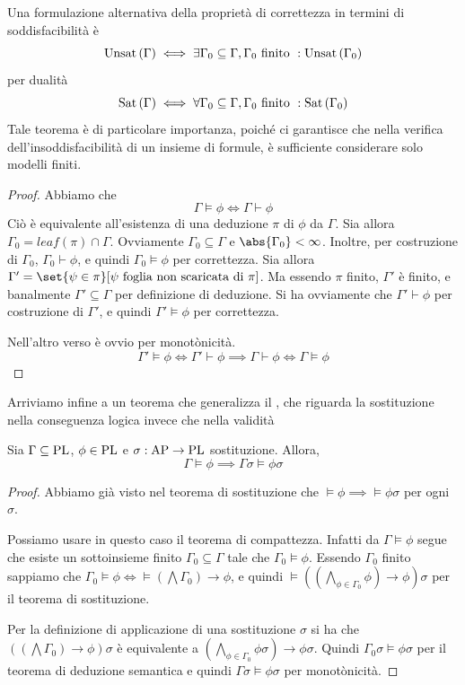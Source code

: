 Una formulazione alternativa della proprietà di correttezza in termini di soddisfacibilità è
\[\Unsat[\Gamma] \iff \exists \Gamma_0 \subseteq \Gamma, \Gamma_0 \text{ finito }: \Unsat[\Gamma_0]\]
per dualità
\[\Sat[\Gamma] \iff \forall \Gamma_0 \subseteq \Gamma, \Gamma_0 \text{ finito }: \Sat[\Gamma_0]\]
Tale teorema è di particolare importanza, poiché ci garantisce che nella verifica dell'insoddisfacibilità di un insieme di formule, è sufficiente considerare solo modelli finiti.

\begin{proof}
  Abbiamo che 
  \[\Gamma \models \phi \iff \Gamma \vdash \phi\]
  Ciò è equivalente all'esistenza di una deduzione \(\pi\) di \(\phi\) da \(\Gamma\).
  Sia allora \(\Gamma_0 = leaf(\pi)\cap \Gamma\). Ovviamente \(\Gamma_0\subseteq\Gamma\) e \(\abs{\Gamma_0}<\infty\).
  Inoltre, per costruzione di \(\Gamma_0\), \(\Gamma_0\vdash\phi\), e quindi \(\Gamma_0\models\phi\) per correttezza.
  Sia allora \(\Gamma' = \set{\psi \in \pi}[\psi \text{ foglia non scaricata di }\pi]\).
  Ma essendo \(\pi\) finito, \(\Gamma'\) è finito, e banalmente \(\Gamma' \subseteq \Gamma\) per definizione di deduzione.
  Si ha ovviamente che \(\Gamma' \vdash \phi\) per costruzione di \(\Gamma'\), e quindi \(\Gamma' \models \phi\) per correttezza.

  Nell'altro verso è ovvio per monotònicità.
  \[\Gamma'\models\phi\iff\Gamma'\vdash\phi\implies\Gamma\vdash\phi\iff\Gamma\models\phi\]
\end{proof}

Arriviamo infine a un teorema che generalizza il , che riguarda la sostituzione nella conseguenza logica invece che nella validità

\begin{theorem}{}
  Sia \(\Gamma \subseteq \operatorname{PL}\), \(\phi \in \operatorname{PL}\) e \(\sigma:\AP \to \PL\) sostituzione. Allora,
  \[\Gamma\models\phi\implies\Gamma\sigma\models\phi\sigma\]
\end{theorem}

\begin{proof}
  Abbiamo già visto nel teorema di sostituzione che \(\models\phi \implies \models\phi\sigma\) per ogni \(\sigma\).

  Possiamo usare in questo caso il teorema di compattezza. Infatti da \(\Gamma\models\phi\) segue che esiste un sottoinsieme finito \(\Gamma_0 \subseteq \Gamma\) tale che \(\Gamma_0\models\phi\).
  Essendo \(\Gamma_0\) finito sappiamo che \(\Gamma_0\models\phi\iff\models(\bigwedge\Gamma_0)\to\phi\), e quindi \(\models((\bigwedge_{\phi\in\Gamma_0}\phi)\to\phi)\sigma\) per il teorema di sostituzione.

  Per la definizione di applicazione di una sostituzione \(\sigma\) si ha che \(((\bigwedge\Gamma_0)\to\phi)\sigma\) è equivalente a \((\bigwedge_{\phi\in\Gamma_0}\phi\sigma)\to\phi\sigma\).
  Quindi \(\Gamma_0\sigma\models\phi\sigma\) per il teorema di deduzione semantica e quindi \(\Gamma\sigma\models\phi\sigma\) per monotònicità.
\end{proof}

